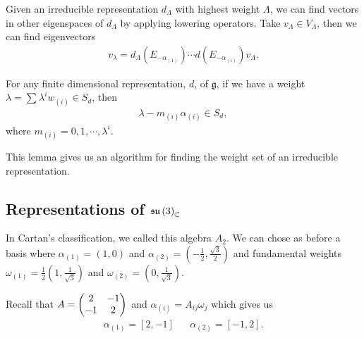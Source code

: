 
Given an irreducible representation $d_\Lambda$ with highest weight $\Lambda$, we can find vectors in other eigenspaces of $d_\Lambda$ by applying lowering operators. Take $v_{\Lambda} \in V_\Lambda$, then we can find eigenvectors
\begin{align}
    v_\lambda = d_\Lambda \left( E_{-\alpha_{\left( 1 \right) }} \right) \cdots d\left( E_{-\alpha_{\left( i \right) }} \right) v_\Lambda
.\end{align}

\begin{lemma}
    For any finite dimensional representation, $d$, of $\mathfrak{g}$, if we have a weight $\lambda = \sum_{}^{} \lambda^{i} w_{\left( i \right) } \in S_d$, then
    \begin{align}
        \lambda - m_{\left( i \right) } \alpha_{\left( i \right) } \in S_d
    ,\end{align}
    where $m_{\left( i \right) } = 0,1,\cdots,\lambda^{i}$.
\end{lemma}

This lemma gives us an algorithm for finding the weight set of an irreducible representation.

\subsection{Representations of $\mathfrak{su}\left( 3 \right)_{\mathbb{C}}$}

In Cartan's classification, we called this algebra $A_2$. We can chose as before a basis where $\alpha_{\left( 1 \right) } = \left( 1,0 \right) $ and $\alpha_{\left( 2 \right) } = \left( -\frac{1}{2}, \frac{\sqrt{3} }{2} \right) $ and fundamental weights $\omega_{\left( 1 \right) } = \frac{1}{2} \left( 1 , \frac{1}{\sqrt{3} } \right) $ and $\omega_{\left( 2 \right) } = \left( 0,\frac{1}{\sqrt{3}} \right) $.

Recall that $A = \mqty( 2 & -1 \\ -1 & 2)$ and $\alpha_{\left( i \right) } = A_{ij} \omega_{j}$ which gives us
\begin{align}
    \alpha_{\left( 1 \right) } = \left[ 2,-1 \right]  && \alpha_{\left( 2 \right) } = \left[ -1,2 \right] 
.\end{align}

